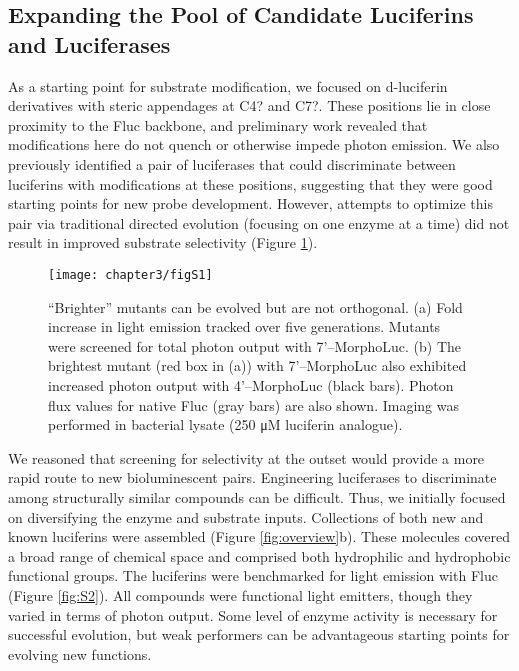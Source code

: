 \subsection*{Expanding the Pool of Candidate Luciferins and Luciferases}
As a starting point for substrate modification, we focused on d-luciferin derivatives with steric appendages at C4? and C7?. These positions lie in close proximity to the Fluc backbone,\cite{Sundlov:2012kn} and preliminary work revealed that modifications here do not quench or otherwise impede photon emission.\cite{Jones:2017be} We also previously identified a pair of luciferases that could discriminate between luciferins with modifications at these positions,\cite{Jones:2017be} suggesting that they were good starting points for new probe development. However, attempts to optimize this pair via traditional directed evolution (focusing on one enzyme at a time) did not result in improved substrate selectivity (Figure \ref{fig:S1}).
\begin{figure}[htb]
\texttt{[image: chapter3/figS1]}
\centering
\caption[“Brighter” mutants can be evolved but are not orthogonal.]{“Brighter” mutants can be evolved but are not orthogonal. (a) Fold increase in light emission tracked over five generations. Mutants were screened for total photon output with 7'–MorphoLuc. (b) The brightest mutant (red box in (a)) with 7'–MorphoLuc also exhibited increased photon output with 4'–MorphoLuc (black bars). Photon flux values for native Fluc (gray bars) are also shown. Imaging was performed in bacterial lysate (250 μM luciferin analogue).}
  \label{fig:S1}
\end{figure}
\par
We reasoned that screening for selectivity at the outset would provide a more rapid route to new bioluminescent pairs. Engineering luciferases to discriminate among structurally similar compounds can be difficult.\cite{Mofford:2014iwa,Harwood:2011gl} Thus, we initially focused on diversifying the enzyme and substrate inputs. Collections of both new and known\cite{Steinhardt:2016in,Jones:2017be} luciferins were assembled (Figure \ref{fig:overview}b). These molecules covered a broad range of chemical space and comprised both hydrophilic and hydrophobic functional groups. The luciferins were benchmarked for light emission with Fluc (Figure \ref{fig:S2}). All compounds were functional light emitters, though they varied in terms of photon output. Some level of enzyme activity is necessary for successful evolution, but weak performers can be advantageous starting points for evolving new functions.\cite{Renata:2015is}
